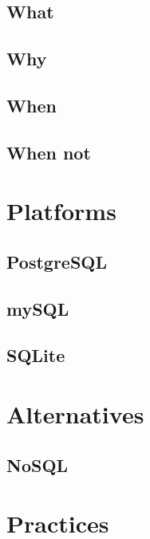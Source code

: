 \documentclass[
]{book}
\begin{document}
\hypertarget{what}{%
\section{What}\label{what}}

\hypertarget{why}{%
\section{Why}\label{why}}

\hypertarget{when}{%
\section{When}\label{when}}

\hypertarget{when-not}{%
\section{When not}\label{when-not}}

\hypertarget{platforms}{%
\chapter{Platforms}\label{platforms}}

\hypertarget{postgresql}{%
\section{PostgreSQL}\label{postgresql}}

\hypertarget{mysql}{%
\section{mySQL}\label{mysql}}

\hypertarget{sqlite}{%
\section{SQLite}\label{sqlite}}

\hypertarget{alternatives}{%
\chapter{Alternatives}\label{alternatives}}

\hypertarget{nosql}{%
\section{NoSQL}\label{nosql}}

\hypertarget{practices}{%
\chapter{Practices}\label{practices}}
\end{document}
